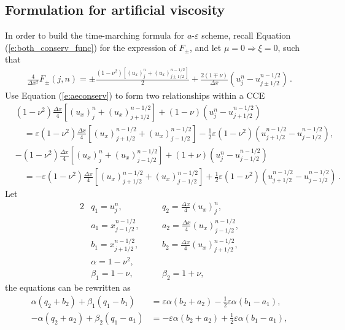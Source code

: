 \documentclass[letterpaper,12pt,dvips]{article}
\numberwithin{equation}{section}
\begin{document}
\subsection{Formulation for artificial viscosity}

In order to build the time-marching formula for $a$-$\varepsilon$ scheme,
recall Equation (\ref{e:both_conserv_func}) for the expression of 
$F_{\pm}$, and let $\mu=0\Rightarrow\xi=0$, such that
\begin{align*}
  \frac{4}{\Delta x^2}F_{\pm}(j,n) 
    = \pm\frac{(1-\nu^2)[(u_x)_j^n+(u_x)_{j\pm1/2}^{n-1/2}]}{2}
    + \frac{2(1\mp\nu)}{\Delta x}(u_j^n-u_{j\pm1/2}^{n-1/2})\,.
\end{align*}
Use Equation (\ref{e:aeconserv}) to form two relationships within a CCE 
\begin{align*}
  &(1-\nu^2)\frac{\Delta x}{4}[(u_x)_j^n+(u_x)_{j+1/2}^{n-1/2}]
    + (1-\nu)(u_j^n-u_{j+1/2}^{n-1/2}) \\
  &\quad = \varepsilon(1-\nu^2)\frac{\Delta x}{4}
           [(u_x)_{j+1/2}^{n-1/2}+(u_x)_{j-1/2}^{n-1/2}]
         - \frac{1}{2}
           \varepsilon(1-\nu^2)(u_{j+1/2}^{n-1/2}-u_{j-1/2}^{n-1/2}), \\
  &-(1-\nu^2)\frac{\Delta x}{4}[(u_x)_j^n+(u_x)_{j-1/2}^{n-1/2}]
    + (1+\nu)(u_j^n-u_{j-1/2}^{n-1/2}) \\
  &\quad = -\varepsilon(1-\nu^2)\frac{\Delta x}{4}
            [(u_x)_{j+1/2}^{n-1/2}+(u_x)_{j-1/2}^{n-1/2}]
          + \frac{1}{2}
            \varepsilon(1-\nu^2)(u_{j+1/2}^{n-1/2}-u_{j-1/2}^{n-1/2})\,.
\end{align*}
Let 
\begin{alignat*}{2}
  &       q_1 = u_j^n, 
  &\quad& q_2 = \frac{\Delta x}{4}(u_x)_j^n, \\
  &       a_1 = x_{j-1/2}^{n-1/2}, 
  &&      a_2 = \frac{\Delta x}{4}(u_x)_{j-1/2}^{n-1/2}, \\
  &       b_1 = x_{j+1/2}^{n-1/2}, 
  &&      b_2 = \frac{\Delta x}{4}(u_x)_{j+1/2}^{n-1/2}, \\
  &       \alpha = 1-\nu^2, && \\
  &       \beta_1 = 1-\nu, 
  &&      \beta_2 = 1+\nu,
\end{alignat*}
the equations can be rewritten as
\begin{align*}
  \alpha(q_2+b_2) + \beta_1(q_1-b_1) 
    &=   \varepsilon\alpha(b_2+a_2) 
       - \frac{1}{2}\varepsilon\alpha(b_1-a_1), \\
  -\alpha(q_2+a_2) + \beta_2(q_1-a_1) 
    &=  -\varepsilon\alpha(b_2+a_2) 
       + \frac{1}{2}\varepsilon\alpha(b_1-a_1), 
\end{align*}
\end{document}
